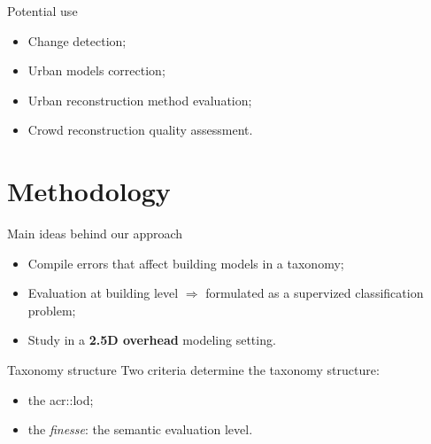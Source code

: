 \documentclass[10pt, export]{beamer}
\begin{document}
        \begin{frame}{Potential use}
            \begin{itemize}[label=$\blacktriangleright$, font=\color{IGNGreen}, itemsep=2em]
                \item<1-> Change detection;
                \item<2-> Urban models correction;
                \item<3-> Urban reconstruction method evaluation;
                \item<4-> Crowd reconstruction quality assessment.
            \end{itemize}
        \end{frame}

    \section{Methodology}
        \begin{frame}{Main ideas behind our approach}
            \begin{itemize}[label=$\blacktriangleright$, font=\color{IGNGreen}, itemsep=2em]
                \item<1-> Compile errors that affect building models in a taxonomy;
                \item<2-> Evaluation at building level $\Longrightarrow$ formulated as a supervized classification problem;
                \item<3-> Study in a \textbf{2.5D overhead} modeling setting.
            \end{itemize}
        \end{frame}
        \begin{frame}{Taxonomy structure}
            Two criteria determine the taxonomy structure:
            \begin{itemize}[label=$\blacktriangleright$, font=\color{IGNGreen}, itemsep=2em]
                \item<2-> the \acrshort{acr::lod};
                \item<3-> the \emph{finesse}: the semantic evaluation level.
            \end{itemize}
            ~\\
        \end{frame}
\end{document}
